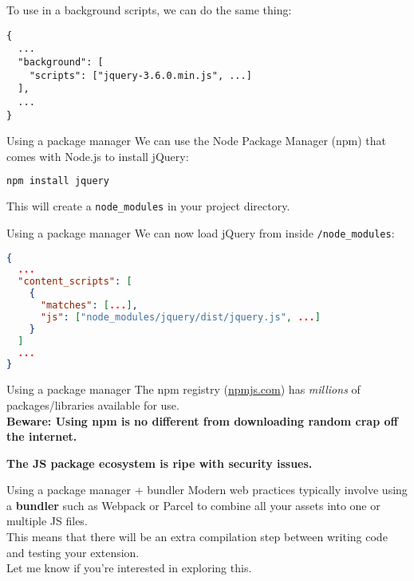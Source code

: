 \documentclass[../index.tex]{subfiles}
\begin{document}
\begin{frame}[fragile]{\currenttitle}
  To use in a background scripts, we can do the same thing:

  \begin{lstlisting}[language=ES6]
{
  ...
  "background": [
    "scripts": ["jquery-3.6.0.min.js", ...]
  ],
  ...
}
  \end{lstlisting}
\end{frame}

\renewcommand{\currenttitle}{Using a package manager}
\begin{frame}[fragile]{\currenttitle}
  We can use the Node Package Manager (npm) that comes with Node.js to install
  jQuery:

  \begin{lstlisting}[language=Bash,basicstyle=\ttfamily\small]
    npm install jquery
  \end{lstlisting}

  \vspace*{1em}
  This will create a \texttt{node\_modules} in your project directory.

\end{frame}

\begin{frame}[fragile]{\currenttitle}
  We can now load jQuery from inside \texttt{/node\_modules}:

  \begin{lstlisting}[language=json]
{
  ...
  "content_scripts": [
    {
      "matches": [...],
      "js": ["node_modules/jquery/dist/jquery.js", ...]
    }
  ]
  ...
}
  \end{lstlisting}
\end{frame}

\begin{frame}[fragile]{\currenttitle}
  The npm registry (\url{npmjs.com}) has \textit{millions} of
  packages/libraries available for use. \\[2em]

  \textbf{Beware: Using npm is no different from downloading random crap off
  the internet.}

  \textbf{The JS package ecosystem is ripe with security issues.}
\end{frame}

\renewcommand{\currenttitle}{Using a package manager + bundler}
\begin{frame}[fragile]{\currenttitle}
  Modern web practices typically involve using a \textbf{bundler} such as
  Webpack or Parcel to combine all your assets into one or multiple JS files.
  \\[1em]

  This means that there will be an extra compilation step between writing code
  and testing your extension. \\[3em]

  Let me know if you're interested in exploring this.
\end{frame}

\end{document}
